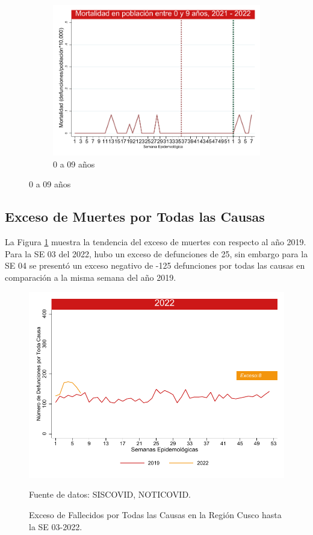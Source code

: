 \documentclass[12pt,a4paper,openany]{book}
\begin{document}
\begin{figure}[h]
	\vspace{10mm}
	\begin{subfigure}[b]{0.45\textwidth}
		\centering
		\includegraphics[width=\textwidth]{../figuras/mortalidad_edad_0.pdf}
		\caption{0 a 09 años}
	\end{subfigure}
\end{figure}
\clearpage	
	\subsection*{Exceso de Muertes por Todas las Causas}
\noindent La Figura \ref{fig:exceso_regional} muestra la tendencia del exceso de muertes con respecto al año 2019. Para la SE 03 del 2022, hubo un exceso de defunciones de 25, sin embargo para la SE 04 se presentó un exceso negativo de -125 defunciones por todas las causas en comparación a la misma semana del año 2019.  

	\begin{figure}[h]
	\caption{Exceso de Fallecidos por Todas las Causas en la Región Cusco hasta la SE 03-2022.}\label{fig:exceso_regional}
	\begin{center}
		\includegraphics[width=0.85\linewidth]{../figuras/exceso_region_2022.pdf}
	\end{center}
	{\footnotesize {Fuente de datos: SISCOVID, NOTICOVID.}}
	\end{figure}
\clearpage
\end{document}
